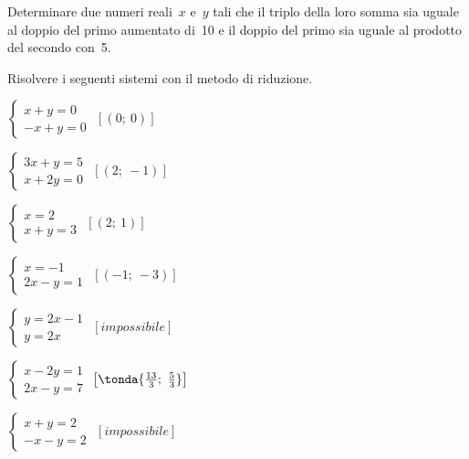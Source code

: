 \begin{esercizio}
 \label{ese:22.15}
Determinare due numeri reali~$x$ e~$y$ tali che il
triplo della loro somma sia uguale al doppio del primo aumentato di~10
e il doppio del primo sia uguale al prodotto del secondo con~5.
 \end{esercizio}


 \begin{esercizio}[\Ast]
 \label{ese:22.20}
Risolvere i seguenti sistemi con il metodo di riduzione.

\begin{multicols}{2}
 \begin{enumeratea}
 \item $\left\{\begin{array}{l}x+y=0\\-x+y=0\end{array}\right.$
 \hfill $\left[(0;~0)\right]$
\item $\left\{\begin{array}{l}3x+y=5\\x+2y=0\end{array}\right.$
 \hfill $\left[(2;~-1)\right]$
\item $\left\{\begin{array}{l}x=2\\x+y=3\end{array}\right.$
 \hfill $\left[(2;~1)\right]$
\item $\left\{\begin{array}{l}x=-1\\2x-y=1\end{array}\right.$
 \hfill $\left[(-1;~-3)\right]$
 \item $\left\{\begin{array}{l}y=2x-1\\y=2x\end{array}\right.$
 \hfill $\left[impossibile\right]$
\item $\left\{\begin{array}{l}x-2y=1\\2x-y=7\end{array}\right.$
 \hfill $\left[\tonda{\frac{13}{3};~\frac{5}{3}}\right]$
\item $\left\{\begin{array}{l}x+y=2\\-x-y=2\end{array}\right.$
 \hfill $\left[impossibile\right]$

\end{enumeratea}
\end{multicols}
\end{esercizio}
